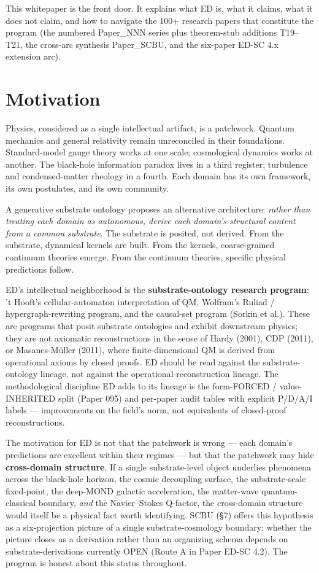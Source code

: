 \documentclass[11pt,a4paper]{article}
\begin{document}
This whitepaper is the front door. It explains what ED is, what it claims, what it does not claim, and how to navigate the 100+ research papers that constitute the program (the numbered Paper\_NNN series plus theorem-stub additions T19--T21, the cross-arc synthesis Paper\_SCBU, and the six-paper ED-SC 4.x extension arc).

\section{Motivation}

Physics, considered as a single intellectual artifact, is a patchwork. Quantum mechanics and general relativity remain unreconciled in their foundations. Standard-model gauge theory works at one scale; cosmological dynamics works at another. The black-hole information paradox lives in a third register; turbulence and condensed-matter rheology in a fourth. Each domain has its own framework, its own postulates, and its own community.

A generative substrate ontology proposes an alternative architecture: \emph{rather than treating each domain as autonomous, derive each domain's structural content from a common substrate}. The substrate is posited, not derived. From the substrate, dynamical kernels are built. From the kernels, coarse-grained continuum theories emerge. From the continuum theories, specific physical predictions follow.

ED's intellectual neighborhood is the \textbf{substrate-ontology research program}: 't Hooft's cellular-automaton interpretation of QM, Wolfram's Ruliad / hypergraph-rewriting program, and the causal-set program (Sorkin et al.). These are programs that posit substrate ontologies and exhibit downstream physics; they are not axiomatic reconstructions in the sense of Hardy (2001), CDP (2011), or Masanes-M\"uller (2011), where finite-dimensional QM is derived from operational axioms by closed proofs. ED should be read against the substrate-ontology lineage, not against the operational-reconstruction lineage. The methodological discipline ED adds to its lineage is the form-FORCED / value-INHERITED split (Paper 095) and per-paper audit tables with explicit P/D/A/I labels --- improvements on the field's norm, not equivalents of closed-proof reconstructions.

The motivation for ED is not that the patchwork is wrong --- each domain's predictions are excellent within their regimes --- but that the patchwork may hide \textbf{cross-domain structure}. If a single substrate-level object underlies phenomena across the black-hole horizon, the cosmic decoupling surface, the substrate-scale fixed-point, the deep-MOND galactic acceleration, the matter-wave quantum-classical boundary, \emph{and} the Navier--Stokes Q-factor, the cross-domain structure would itself be a physical fact worth identifying. SCBU (\S7) offers this hypothesis as a six-projection picture of a single substrate-cosmology boundary; whether the picture closes as a derivation rather than an organizing schema depends on substrate-derivations currently OPEN (Route A in Paper ED-SC 4.2). The program is honest about this status throughout.
\end{document}
